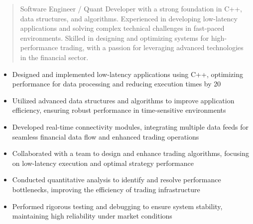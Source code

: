 



\makecvheader

\begin{quote}
  \noindent
  Software Engineer / Quant Developer with a strong foundation in C++, data structures, and algorithms. Experienced in developing low-latency applications and solving complex technical challenges in fast-paced environments. Skilled in designing and optimizing systems for high-performance trading, with a passion for leveraging advanced technologies in the financial sector.
\end{quote}

\par\smallskip
\noindent
\begin{minipage}{20cm}
  \begin{minipage}{9.75cm}
    \begin{itemize}
      \item Designed and implemented low-latency applications using C++, optimizing performance for data processing and reducing execution times by 20%
      \item Utilized advanced data structures and algorithms to improve application efficiency, ensuring robust performance in time-sensitive environments
      \item Developed real-time connectivity modules, integrating multiple data feeds for seamless financial data flow and enhanced trading operations
    \end{itemize}
  \end{minipage}
  \hfill
  \begin{minipage}{9.75cm}
    \begin{itemize}
      \item Collaborated with a team to design and enhance trading algorithms, focusing on low-latency execution and optimal strategy performance
      \item Conducted quantitative analysis to identify and resolve performance bottlenecks, improving the efficiency of trading infrastructure
      \item Performed rigorous testing and debugging to ensure system stability, maintaining high reliability under market conditions
    \end{itemize}
  \end{minipage}
\end{minipage}
\par\smallskip
\divider

